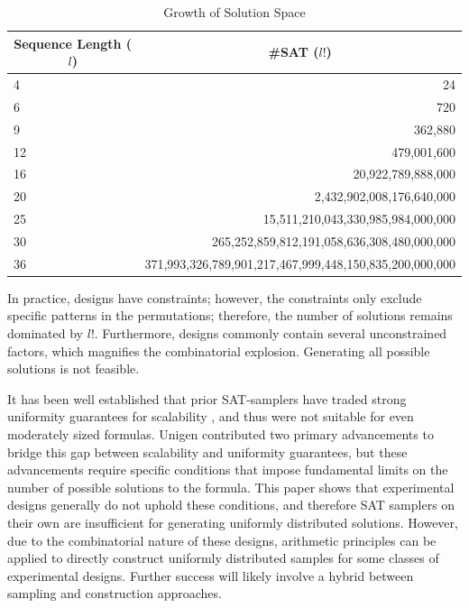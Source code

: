 \begin{table}[htb]
  \centering
  \caption{Growth of Solution Space}
\begin{tabular}{|l|r|}
\hline
\multicolumn{1}{|c|}{\textbf{Sequence Length ($l$)}} & \multicolumn{1}{c|}{\textbf{\#SAT ($l!$)}}              \\ \hline
4                                                    & 24                                                      \\ \hline
6                                                    & 720                                                     \\ \hline
9                                                    & 362,880                                                 \\ \hline
12                                                   & 479,001,600                                             \\ \hline
16                                                   & 20,922,789,888,000                                      \\ \hline
20                                                   & 2,432,902,008,176,640,000                               \\ \hline
25                                                   & 15,511,210,043,330,985,984,000,000                      \\ \hline
30                                                   & 265,252,859,812,191,058,636,308,480,000,000             \\ \hline
36                                                   & 371,993,326,789,901,217,467,999,448,150,835,200,000,000 \\ \hline
\end{tabular}
\label{tab:factorial_explosion}
\end{table}

In practice, designs have constraints; however, the constraints only exclude specific patterns in the permutations; therefore, the number of solutions remains dominated by $l!$. Furthermore, designs commonly contain several unconstrained factors, which magnifies the combinatorial explosion. Generating all possible solutions is not feasible.

It has been well established that prior SAT-samplers have traded strong uniformity guarantees for scalability \cite{chakraborty_balancing_2014}, and thus were not suitable for even moderately sized formulas. Unigen \cite{chakraborty_balancing_2014} contributed two primary advancements to bridge this gap between scalability and uniformity guarantees, but these advancements require specific conditions that impose fundamental limits on the number of possible solutions to the formula. This paper shows that experimental designs generally do not uphold these conditions, and therefore SAT samplers on their own are insufficient for generating uniformly distributed solutions. However, due to the combinatorial nature of these designs, arithmetic principles can be applied to directly construct uniformly distributed samples for some classes of experimental designs. Further success will likely involve a hybrid between sampling and construction approaches.
